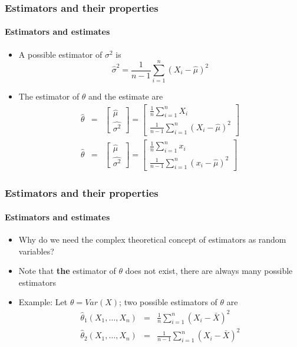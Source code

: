 \documentclass[notes=show]{beamer}
\begin{document}
\begin{frame}\frametitle{Estimators and their properties}\framesubtitle{Estimators and estimates}
\begin{itemize}
    \item A possible estimator of $\sigma ^{2}$ is
        \begin{equation*}
            \hat{\sigma}^{2}=\frac{1}{n-1}\sum_{i=1}^{n}\left( X_{i}-\hat{\mu}\right)^{2}
        \end{equation*}
    \item The estimator of $\theta $ and the estimate are
        \begin{eqnarray*}
            \hat{\theta} &=&\left[
            \begin{array}{c}
            \hat{\mu} \\
            \hat{\sigma ^{2}}%
            \end{array}%
            \right] =\left[
            \begin{array}{c}
            \frac{1}{n}\sum_{i=1}^{n}X_{i} \\
            \frac{1}{n-1}\sum_{i=1}^{n}\left( X_{i}-\hat{\mu}\right) ^{2}%
            \end{array}%
            \right] \\
            \hat{\theta} &=&\left[
            \begin{array}{c}
            \hat{\mu} \\
            \hat{\sigma ^{2}}%
            \end{array}%
            \right] =\left[
            \begin{array}{c}
            \frac{1}{n}\sum_{i=1}^{n}x_{i} \\
            \frac{1}{n-1}\sum_{i=1}^{n}\left( x_{i}-\hat{\mu}\right) ^{2}%
            \end{array}%
            \right]
        \end{eqnarray*}
\end{itemize}
\end{frame}


\begin{frame}\frametitle{Estimators and their properties}\framesubtitle{Estimators and estimates}
\begin{itemize}
    \item Why do we need the complex theoretical concept of estimators as random variables?
    \item Note that \textbf{the} estimator of $\theta $ does not exist, there are always many possible estimators
    \item Example: Let $\theta =Var(X)$; two possible estimators of $\theta $ are
        \begin{eqnarray*}
        \hat{\theta}_{1}(X_{1},\ldots ,X_{n}) &=&\frac{1}{n}\sum_{i=1}^{n}\left(X_{i}-\bar{X}\right) ^{2} \\
        \hat{\theta}_{2}(X_{1},\ldots ,X_{n}) &=&\frac{1}{n-1}\sum_{i=1}^{n}\left(X_{i}-\bar{X}\right) ^{2}
        \end{eqnarray*}
\end{itemize}
\end{frame}
\end{document}
